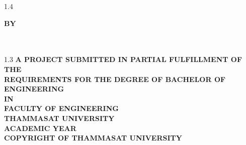 \pagestyle{empty}
\begin{center}
	\vspace*{40mm}
	\begin{spacing}{1.4}
		\textbf{\huge\titleEngCover}
	\end{spacing}
	\vspace*{35mm}
	\textbf{BY}\\
	\vspace*{10mm}
	\textbf{\authorAEng}\\
	\textbf{\authorBEng}\\
	\vfill
	\begin{spacing}{1.3}
		\textbf{A PROJECT SUBMITTED IN PARTIAL FULFILLMENT OF THE\\
			REQUIREMENTS FOR THE DEGREE OF BACHELOR OF ENGINEERING\\
			IN \MakeUppercase{\majorEng}\\
			FACULTY OF ENGINEERING\\ THAMMASAT UNIVERSITY\\
			ACADEMIC YEAR \academicYearEng\\ COPYRIGHT OF THAMMASAT UNIVERSITY}
	\end{spacing}
\end{center}
